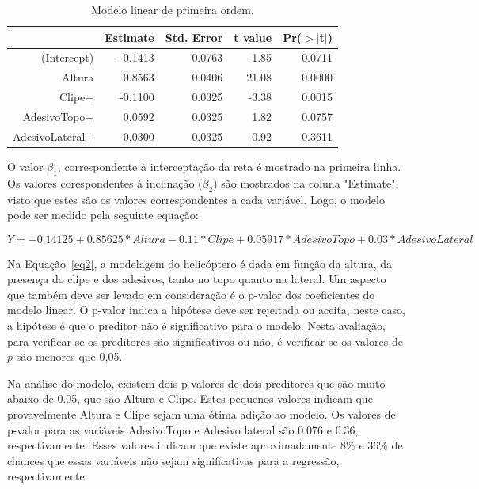 \begin{table}[h]
    \centering
    \caption{Modelo linear de primeira ordem.}
    \begin{tabular}{rrrrr}
      \hline
     & Estimate & Std. Error & t value & Pr($>$$|$t$|$) \\ 
      \hline
    (Intercept) & -0.1413 & 0.0763 & -1.85 & 0.0711 \\ 
      Altura & 0.8563 & 0.0406 & 21.08 & 0.0000 \\ 
      Clipe+ & -0.1100 & 0.0325 & -3.38 & 0.0015 \\ 
      AdesivoTopo+ & 0.0592 & 0.0325 & 1.82 & 0.0757 \\ 
      AdesivoLateral+ & 0.0300 & 0.0325 & 0.92 & 0.3611 \\ 
       \hline
    \end{tabular}
    \label{tab:primor}
    \end{table}



O valor $\beta_1$, correspondente à interceptação da reta é mostrado na primeira linha. Os valores corespondentes à inclinação ($\beta_2$) são mostrados na coluna "Estimate", visto que estes são os valores correspondentes a cada variável. Logo, o modelo pode ser medido pela seguinte equação:

\begin{equation}\label{eq2}
Y = - 0.14125 + 0.85625 * Altura - 0.11 * Clipe + 0.05917 * AdesivoTopo + 0.03 * AdesivoLateral
\end{equation}

Na Equação~\ref{eq2}, a modelagem do helicóptero é dada em função da altura, da presença do clipe e dos adesivos, tanto no topo quanto na lateral. Um aspecto que também deve ser levado em consideração é o p-valor dos coeficientes do modelo linear. O p-valor indica a hipótese deve ser rejeitada ou aceita, neste caso, a hipótese é que o preditor não é significativo para o modelo. Nesta avaliação, para verificar se os preditores são significativos ou não, é verificar se os valores de $p$ são menores que 0,05.

Na análise do modelo, existem dois p-valores de dois preditores que são muito abaixo de 0.05, que são Altura e Clipe. Estes pequenos valores indicam que provavelmente Altura e Clipe sejam uma ótima adição ao modelo. Os valores de p-valor para as variáveis AdesivoTopo e Adesivo lateral são 0.076 e 0.36, respectivamente. Esses valores indicam que existe aproximadamente 8\% e 36\% de chances que essas variáveis não sejam significativas para a regressão, respectivamente.

